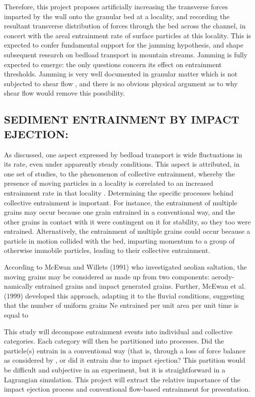 Therefore, this project proposes artificially increasing the transverse forces imparted by the wall onto the granular bed at a locality, and recording the resultant transverse distribution of forces through the bed across the channel, in concert with the areal entrainment rate of surface particles at this locality. This is expected to confer fundamental support for the jamming hypothesis, and shape subsequent research on bedload transport in mountain streams. Jamming is fully expected to emerge: the only questions concern its effect on entrainment thresholds. Jamming is very well documented in granular matter which is not subjected to shear flow \citep{Corwin2005, Liu2010}, and there is no obvious physical argument as to why shear flow would remove this possibility.  


\subsection{SEDIMENT ENTRAINMENT BY IMPACT EJECTION:}

As discussed, one aspect expressed by bedload transport is wide fluctuations in its rate, even under apparently steady conditions. This aspect is attributed, in one set of studies, to the phenomenon of collective entrainment, whereby the presence of moving particles in a locality is correlated to an increased entrainment rate in that locality  \citep{Ancey2006,Ancey2008,Heyman2014, Ancey2014, Heyman2016}. Determining the specific processes behind collective entrainment is important. For instance, the entrainment of multiple grains may occur because one grain entrained in a conventional way, and the other grains in contact with it were contingent on it for stability, so they too were entrained. Alternatively, the entrainment of multiple grains could occur because a particle in motion collided with the bed, imparting momentum to a group of otherwise immobile particles, leading to their collective entrainment. 

According to McEwan and Willets (1991) who investigated aeolian saltation, the
moving grains may be considered as made up from two components: aerody- namically entrained grains and impact generated grains. Further, McEwan et al. (1999) developed this approach, adapting it to the fluvial conditions, suggesting that the number of uniform grains Ne entrained per unit area per unit time is equal to
\bigskip 

This study will decompose entrainment events into individual and collective categories. Each category will then be partitioned into processes. Did the particle(s) entrain in a conventional way (that is, through a loss of force balance as considered by \cite{Wiberg1987}, or did it entrain due to impact ejection? This partition would be difficult and subjective in an experiment, but it is straightforward in a Lagrangian simulation. This project will extract the relative importance of the impact ejection process and conventional flow-based entrainment for presentation.  
\bigskip 


